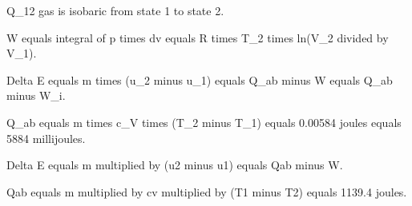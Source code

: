 Q_12 gas is isobaric from state 1 to state 2.  

W equals integral of p times dv equals R times T_2 times ln(V_2 divided by V_1).  

Delta E equals m times (u_2 minus u_1) equals Q_ab minus W equals Q_ab minus W_i.  

Q_ab equals m times c_V times (T_2 minus T_1) equals 0.00584 joules equals 5884 millijoules.

Delta E equals m multiplied by (u2 minus u1) equals Qab minus W.  

Qab equals m multiplied by cv multiplied by (T1 minus T2) equals 1139.4 joules.